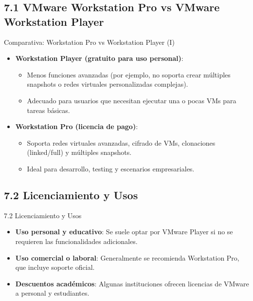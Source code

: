 \documentclass{beamer}
\begin{document}
\subsection{7.1 VMware Workstation Pro vs VMware Workstation Player}
\begin{frame}{Comparativa: Workstation Pro vs Workstation Player (I)}
	\begin{itemize}
		\item \textbf{Workstation Player (gratuito para uso personal)}:
			\begin{itemize}
				\item Menos funciones avanzadas (por ejemplo, no soporta crear múltiples snapshots o redes virtuales personalizadas complejas).
				\item Adecuado para usuarios que necesitan ejecutar una o pocas VMs para tareas básicas.
			\end{itemize}
		\item \textbf{Workstation Pro (licencia de pago)}:
			\begin{itemize}
				\item Soporta redes virtuales avanzadas, cifrado de VMs, clonaciones (linked/full) y múltiples snapshots.
				\item Ideal para desarrollo, testing y escenarios empresariales.
			\end{itemize}
	\end{itemize}
\end{frame}

\subsection{7.2 Licenciamiento y Usos}
\begin{frame}{7.2 Licenciamiento y Usos}
	\begin{itemize}
		\item \textbf{Uso personal y educativo}: Se suele optar por VMware Player si no se requieren las funcionalidades adicionales.
		\item \textbf{Uso comercial o laboral}: Generalmente se recomienda Workstation Pro, que incluye soporte oficial.
		\item \textbf{Descuentos académicos}: Algunas instituciones ofrecen licencias de VMware a personal y estudiantes.
	\end{itemize}
\end{frame}

\end{document}
